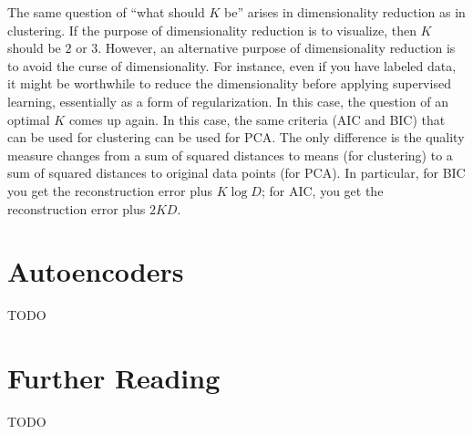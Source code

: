 The same question of ``what should $K$ be'' arises in dimensionality
reduction as in clustering.  If the purpose of dimensionality
reduction is to visualize, then $K$ should be $2$ or $3$.  However, an
alternative purpose of dimensionality reduction is to avoid the curse
of dimensionality.  For instance, even if you have labeled data, it
might be worthwhile to reduce the dimensionality before applying
supervised learning, essentially as a form of regularization.  In this
case, the question of an optimal $K$ comes up again.  In this case,
the same criteria (AIC and BIC) that can be used for clustering can be
used for PCA.  The only difference is the quality measure changes from
a sum of squared distances to means (for clustering) to a sum of
squared distances to original data points (for PCA).  In particular,
for BIC you get the reconstruction error plus $K \log D$; for AIC, you
get the reconstruction error plus $2 K D$.

\section{Autoencoders}

TODO

\section{Further Reading}

TODO














\begin{comment}
- pca
- lsa/svd
- mds
- manifold
- JL
- kmeans++
- hierarchical clustering
- spectral clustering
\end{comment}



